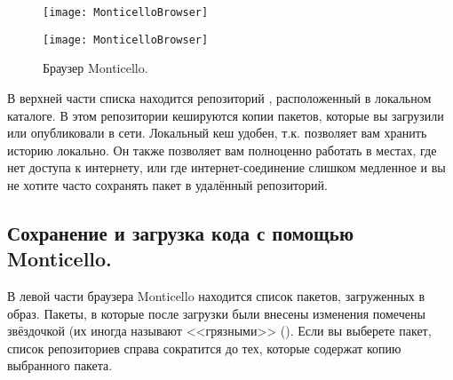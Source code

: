 \documentclass[a4paper,10pt,twoside]{book}
\begin{document}
\begin{figure}[hbt]
\ifluluelse
	{\centerline {\texttt{[image: MonticelloBrowser]}}}
	{\centerline {\texttt{[image: MonticelloBrowser]}}}
\caption{Браузер Monticello.
}
\end{figure}

В верхней части списка находится репозиторий , расположенный в локальном каталоге. В этом репозитории кешируются копии пакетов, которые вы загрузили или опубликовали в сети. Локальный кеш удобен, т.к. позволяет вам хранить историю локально. Он также позволяет вам полноценно работать в местах, где нет доступа к интернету, или где интернет-соединение слишком медленное и вы не хотите часто сохранять пакет в удалённый репозиторий.


\subsection{Сохранение и загрузка кода с помощью Monticello.}
В левой части браузера Monticello находится список пакетов, загруженных в образ. Пакеты, в которые после загрузки были внесены изменения помечены звёздочкой (их иногда называют <<грязными>> (). Если вы выберете пакет, список репозиториев справа сократится до тех, которые содержат копию выбранного пакета.
\end{document}
